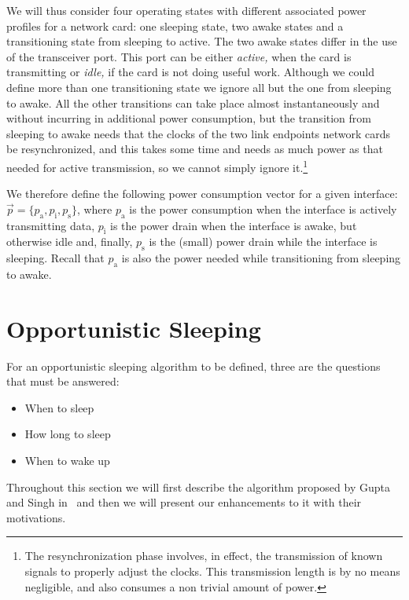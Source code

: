\documentclass[conference,english]{IEEEtran}
\begin{document}
We will thus consider four operating states with different associated power
profiles for a network card: one sleeping state, two awake states and a
transitioning state from sleeping to active. The two awake states differ in
the use of the transceiver port. This port can be either \emph{active,} when
the card is transmitting or \emph{idle,} if the card is not doing useful work.
Although we could define more than one transitioning state we ignore all but
the one from sleeping to awake. All the other transitions can take place
almost instantaneously and without incurring in additional power consumption,
but the transition from sleeping to awake needs that the clocks of the two
link endpoints network cards be resynchronized, and this takes some time and
needs as much power as that needed for active transmission, so we cannot
simply ignore it.\footnote{The resynchronization phase involves, in effect,
  the transmission of known signals to properly adjust the clocks. This
  transmission length is by no means negligible, and also consumes a non
  trivial amount of power.}

We therefore define the following power consumption vector for a given
interface: $\vec p = \{p_\mathrm{a}, p_\mathrm{i}, p_\mathrm{s}\}$, where
$p_\mathrm{a}$ is the power consumption when the interface is actively
transmitting data, $p_\mathrm{i}$ is the power drain when the interface is
awake, but otherwise idle and, finally, $p_\mathrm{s}$ is the (small) power
drain while the interface is sleeping. Recall that $p_{\mathrm{a}}$ is also
the power needed while transitioning from sleeping to awake.

\section{Opportunistic Sleeping}
\label{sec:opport-sleep}

For an opportunistic sleeping algorithm to be defined, three are the questions
that must be answered:
\begin{itemize}
\item When to sleep
\item How long to sleep
\item When to wake up
\end{itemize}

Throughout this section we will first describe the algorithm proposed by Gupta
and Singh in~\cite{gupta07:_using_low_power_modes_for} and then we will
present our enhancements to it with their motivations.
\end{document}
